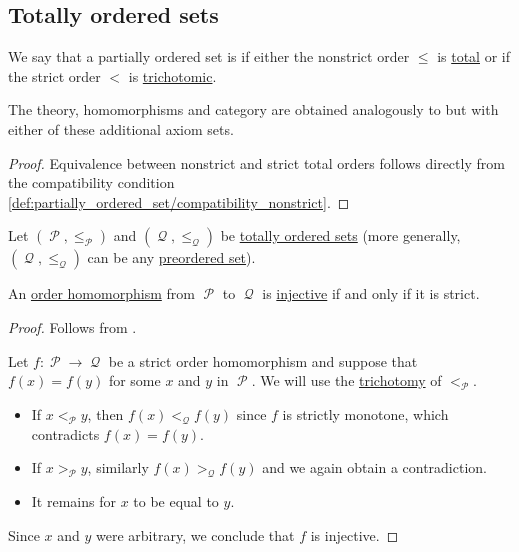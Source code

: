 \subsection{Totally ordered sets}\label{subsec:totally_ordered_sets}

\begin{definition}\label{def:totally_ordered_set}
  We say that a partially ordered set is  if either the nonstrict order \( \leq \) is \hyperref[def:binary_relation/total]{total} or if the strict order \( < \) is \hyperref[def:binary_relation/trichotomic]{trichotomic}.

  The theory, homomorphisms and category are obtained analogously to  but with either of these additional axiom sets.
\end{definition}
\begin{proof}
  Equivalence between nonstrict and strict total orders follows directly from the compatibility condition \eqref{def:partially_ordered_set/compatibility_nonstrict}.
\end{proof}

\begin{proposition}\label{thm:total_order_embedding_iff_strict}
  Let \( (\mscrP, \leq_\mscrP) \) and \( (\mscrQ, \leq_\mscrQ) \) be \hyperref[def:totally_ordered_set]{totally ordered sets} (more generally, \( (\mscrQ, \leq_\mscrQ) \) can be any \hyperref[def:preordered_set]{preordered set}).

  An \hyperref[def:partially_ordered_set/homomorphism]{order homomorphism} from \( \mscrP \) to \( \mscrQ \) is \hyperref[def:function_invertibility/injective]{injective} if and only if it is strict.
\end{proposition}
\begin{proof}
  \SufficiencySubProof Follows from .

  \NecessitySubProof Let \( f: \mscrP \to \mscrQ \) be a strict order homomorphism and suppose that \( f(x) = f(y) \) for some \( x \) and \( y \) in \( \mscrP \). We will use the \hyperref[def:binary_relation/trichotomic]{trichotomy} of \( <_\mscrP \).
  \begin{itemize}
    \item If \( x <_\mscrP y \), then \( f(x) <_\mscrQ f(y) \) since \( f \) is strictly monotone, which contradicts \( f(x) = f(y) \).

    \item If \( x >_\mscrP y \), similarly \( f(x) >_\mscrQ f(y) \) and we again obtain a contradiction.

    \item It remains for \( x \) to be equal to \( y \).
  \end{itemize}

  Since \( x \) and \( y \) were arbitrary, we conclude that \( f \) is injective.
\end{proof}

